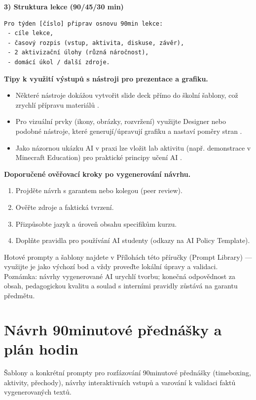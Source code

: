 \documentclass{report}%
\begin{document}
\textbf{3) Struktura lekce (90/45/30 min)}
\begin{verbatim}
Pro týden [číslo] připrav osnovu 90min lekce:
 - cíle lekce,
 - časový rozpis (vstup, aktivita, diskuse, závěr),
 - 2 aktivizační úlohy (různá náročnost),
 - domácí úkol / další zdroje.
\end{verbatim}

\medskip
\textbf{Tipy k využití výstupů s nástroji pro prezentace a grafiku.}
\begin{itemize}
  \item Některé nástroje dokážou vytvořit slide deck přímo do školní šablony, což zrychlí přípravu materiálů \cite{kb_ai_101_tipu_pdf_04e4a115_page_44_2}.
  \item Pro vizuální prvky (ikony, obrázky, rozvržení) využijte Designer nebo podobné nástroje, které generují/úpravují grafiku a nastaví poměry stran \cite{kb_ai_101_tipu_pdf_04e4a115_page_51_1}.
  \item Jako názornou ukázku AI v praxi lze vložit lab aktivitu (např. demonstrace v Minecraft Education) pro praktické principy učení AI \cite{kb_ai_101_tipu_pdf_04e4a115_page_15_2}.
\end{itemize}

\medskip
\textbf{Doporučené ověřovací kroky po vygenerování návrhu.}
\begin{enumerate}
  \item Projděte návrh s garantem nebo kolegou (peer review).
  \item Ověřte zdroje a faktická tvrzení.
  \item Přizpůsobte jazyk a úroveň obsahu specifikům kurzu.
  \item Doplňte pravidla pro používání AI studenty (odkazy na AI Policy Template).
\end{enumerate}

\medskip
Hotové prompty a šablony najdete v Přílohách této příručky (Prompt Library) — využijte je jako výchozí bod a vždy proveďte lokální úpravy a validaci. Poznámka: návrhy vygenerované AI urychlí tvorbu; konečná odpovědnost za obsah, pedagogickou kvalitu a soulad s interními pravidly zůstává na garantu předmětu.%

%
\section{Návrh 90minutové přednášky a plán hodin}%
Šablony a konkrétní prompty pro rozfázování 90minutové přednášky (timeboxing, aktivity, přechody), návrhy interaktivních vstupů a varování k validaci faktů vygenerovaných textů.%
\end{document}
